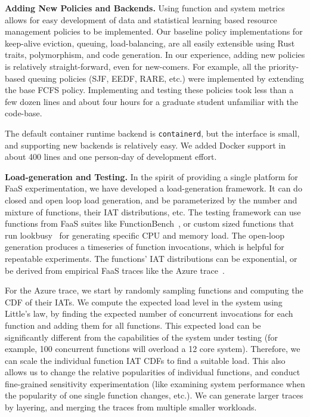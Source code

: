 \noindent \textbf{Adding New Policies and Backends.}
%
Using function and system metrics allows for easy development of data and statistical learning based resource management policies to be implemented.
Our baseline policy implementations for keep-alive eviction, queuing, load-balancing, are all easily extensible using Rust traits, polymorphism, and code generation. 
In our experience, adding new policies is relatively straight-forward, even for new-comers.
For example, all the priority-based queuing policies (SJF, EEDF, RARE, etc.) were implemented by extending the base FCFS policy.
Implementing and testing these policies took less than a few dozen lines and about four hours for a graduate student unfamiliar with the code-base. 

The default container runtime backend is \texttt{containerd}, but the interface is small, and supporting new backends is relatively easy.
We added Docker support in about 400 lines and one person-day of development effort.


\textbf{Load-generation and Testing.}
In the spirit of providing a single platform for FaaS experimentation, we have developed a load-generation framework.
It can do closed and open loop load generation, and be parameterized by the number and mixture of functions, their IAT distributions, etc. 
The testing framework can use functions from FaaS suites like FunctionBench~\cite{kim2019functionbench}, or custom sized functions that run lookbusy~\cite{lookbusy} for generating specific CPU and memory load.
%
The open-loop generation produces a timeseries of function invocations, which is helpful for repeatable experiments.
The functions' IAT distributions can be exponential, or be derived from empirical FaaS traces like the Azure trace~\cite{shahrad_serverless_2020}.


For the Azure trace, we start by randomly sampling functions and computing the CDF of their IATs.
We compute the expected load level in the system using Little's law, by finding the expected number of concurrent invocations for each function and adding them for all functions.
This expected load can be significantly different from the capabilities of the system under testing (for example, 100 concurrent functions will overload a 12 core system). 
Therefore, we can scale the individual function IAT CDFs to find a suitable load. This also allows us to change the relative popularities of individual functions, and conduct fine-grained sensitivity experimentation (like examining system performance when the popularity of one single function
changes, etc.).
We can generate larger traces by layering, and merging the traces from multiple smaller workloads.  


